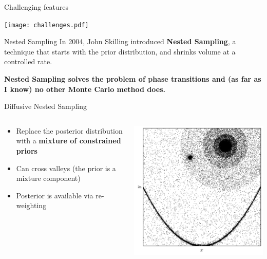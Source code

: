 \begin{frame}[t]{Challenging features}
\begin{center}
\texttt{[image: challenges.pdf]}
\end{center}
\end{frame}

\begin{frame}[t]{Nested Sampling}
In 2004, John Skilling introduced {\bf Nested Sampling}, a technique
that starts with the prior distribution, and shrinks volume at a controlled
rate.
\vspace{20pt}

{\bf Nested Sampling solves the problem of phase transitions and (as far as I
know) no other Monte Carlo method does.}
\end{frame}

\begin{frame}[t]{Diffusive Nested Sampling}
\begin{columns}[T]
\begin{column}{0.35\textwidth}
  \vspace{10pt}
  \begin{itemize}
  \setlength{\itemsep}{20pt}
  \item Replace the posterior distribution with a {\bf mixture of constrained priors}
  \item Can cross valleys (the prior is a mixture component)
  \item Posterior is available via re-weighting
  \end{itemize}
\end{column}
\hfill
\begin{column}{0.5\textwidth}
  \hspace{50pt}
  \includegraphics[scale=0.4]{dnest.png}
\end{column}
\end{columns}
\end{frame}

